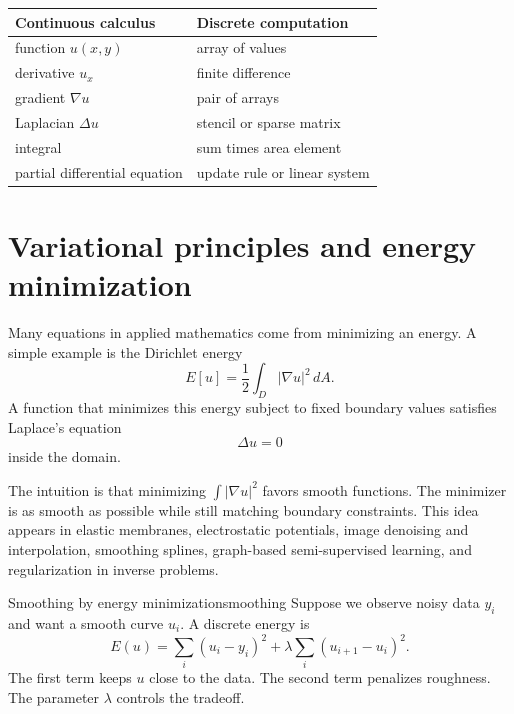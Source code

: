 \documentclass[11pt]{article}
\newcommand{\grad}{\nabla}
\newcommand{\Lap}{\Delta}
\begin{document}
\begin{tipbox}
\begin{center}
\begin{tabular}{@{}ll@{}}
\toprule
Continuous calculus & Discrete computation \\
\midrule
function $u(x,y)$ & array of values \\
derivative $u_x$ & finite difference \\
gradient $\grad u$ & pair of arrays \\
Laplacian $\Lap u$ & stencil or sparse matrix \\
integral & sum times area element \\
partial differential equation & update rule or linear system \\
\bottomrule
\end{tabular}
\end{center}
\end{tipbox}

\section{Variational principles and energy minimization}

Many equations in applied mathematics come from minimizing an energy. A simple example is the Dirichlet energy
\[
E[u]=\frac12\int_D |\grad u|^2\,dA.
\]
A function that minimizes this energy subject to fixed boundary values satisfies Laplace's equation
\[
\Lap u=0
\]
inside the domain.

The intuition is that minimizing $\int |\grad u|^2$ favors smooth functions. The minimizer is as smooth as possible while still matching boundary constraints. This idea appears in elastic membranes, electrostatic potentials, image denoising and interpolation, smoothing splines, graph-based semi-supervised learning, and regularization in inverse problems.

\begin{examplebox}{Smoothing by energy minimization}{smoothing}
Suppose we observe noisy data $y_i$ and want a smooth curve $u_i$. A discrete energy is
\[
E(u)=\sum_i(u_i-y_i)^2+\lambda\sum_i(u_{i+1}-u_i)^2.
\]
The first term keeps $u$ close to the data. The second term penalizes roughness. The parameter $\lambda$ controls the tradeoff.
\end{examplebox}
\end{document}
